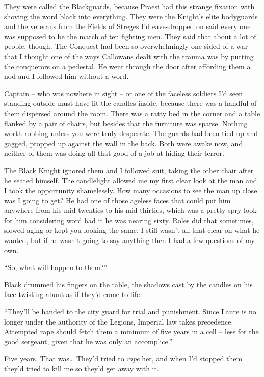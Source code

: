 \documentclass[12pt, openany]{book}
\begin{document}
They were called the Blackguards, because Praesi had this strange fixation with shoving the word black into everything. They were the Knight’s elite bodyguards and the veterans from the Fields of Streges I’d eavesdropped on said every one was supposed to be the match of ten fighting men. They said that about a lot of people, though. The Conquest had been so overwhelmingly one-sided of a war that I thought one of the ways Callowans dealt with the trauma was by putting the conquerors on a pedestal. He went through the door after affording them a nod and I followed him without a word.

Captain – who was nowhere in sight – or one of the faceless soldiers I’d seen standing outside must have lit the candles inside, because there was a handful of them dispersed around the room. There was a ratty bed in the corner and a table flanked by a pair of chairs, but besides that the furniture was sparse. Nothing worth robbing unless you were truly desperate. The guards had been tied up and gagged, propped up against the wall in the back. Both were awake now, and neither of them was doing all that good of a job at hiding their terror. 

The Black Knight ignored them and I followed suit, taking the other chair after he seated himself. The candlelight allowed me my first clear look at the man and I took the opportunity shamelessly. How many occasions to see the man up close was I going to get? He had one of those ageless faces that could put him anywhere from his mid-twenties to his mid-thirties, which was a pretty spry look for him considering word had it he was nearing sixty. Roles did that sometimes, slowed aging or kept you looking the same. I still wasn’t all that clear on what he wanted, but if he wasn’t going to say anything then I had a few questions of my own.

“So, what will happen to them?”

Black drummed his fingers on the table, the shadows cast by the candles on his face twisting about as if they’d come to life.

“They’ll be handed to the city guard for trial and punishment. Since Laure is no longer under the authority of the Legions, Imperial law takes precedence. Attempted rape should fetch them a minimum of five years in a cell – less for the good sergeant, given that he was only an accomplice.”

Five years. That was… They’d tried to \textit{rape} her, and when I’d stopped them they’d tried to kill me so they’d get away with it.
\end{document}
